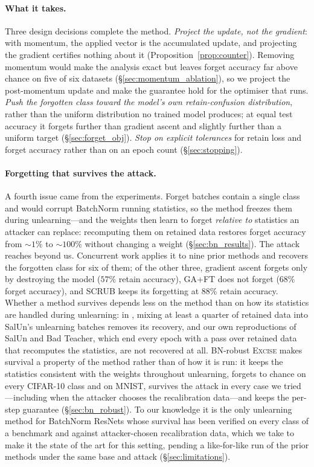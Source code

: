 \documentclass{article}
\newcommand{\ours}{\textsc{Excise}}
\newcommand{\rev}[1]{{\color{revisedB}#1}}
\theoremstyle{remark}
\theoremstyle{plain}
\begin{document}
\paragraph{What it takes.}
Three design decisions \rev{complete the method}. \emph{Project the update, not
the gradient}: with momentum, the applied vector is the accumulated update, and
projecting the gradient certifies nothing about it
(Proposition~\ref{prop:counter}). Removing momentum would make the analysis
exact but \rev{leaves forget accuracy far above chance on five of six datasets}
(\S\ref{sec:momentum_ablation}), so we project the post-momentum update and make
the guarantee hold for the optimiser that runs. \emph{Push the forgotten class
toward the model's own retain-confusion distribution}, rather than the uniform
distribution no trained model produces\rev{; at equal test accuracy it forgets
further than gradient ascent and slightly further than a uniform target}
(\S\ref{sec:forget_obj}). \emph{Stop on explicit tolerances} for retain loss and
forget accuracy rather than on an epoch count (\S\ref{sec:stopping}).

\paragraph{Forgetting that survives the attack.}
A fourth issue came from the experiments. Forget batches contain a single
class and would corrupt BatchNorm running statistics, so the method freezes them
during unlearning---and the weights then learn to forget \emph{relative to}
statistics an attacker can replace: recomputing them on retained data restores
forget accuracy from ${\sim}1\%$ to ${\sim}100\%$ without changing a weight
(\S\ref{sec:bn_results}). \rev{The attack reaches beyond us. Concurrent work
\citep{kalani2026batchnorm} applies it to nine prior methods and recovers the
forgotten class for six of them; of the other three, gradient ascent forgets
only by destroying the model ($57\%$ retain accuracy), GA+FT does not forget
($68\%$ forget accuracy), and SCRUB keeps its forgetting at $88\%$ retain
accuracy. Whether a method survives depends less on the method than on how its
statistics are handled during unlearning: in \citet{kalani2026batchnorm},
mixing at least a quarter of retained data into SalUn's unlearning batches
removes its recovery, and our own reproductions of SalUn and Bad Teacher, which
end every epoch with a pass over retained data that recomputes the statistics,
are not recovered at all. BN-robust \ours{} makes survival a property of the
method rather than of how it is run: it keeps the statistics consistent with the
weights throughout unlearning, forgets to chance on every CIFAR-10 class and on
MNIST, survives the attack in every case we tried---including when the attacker
chooses the recalibration data---and keeps the per-step guarantee
(\S\ref{sec:bn_robust}). To our knowledge it is the only unlearning method for
BatchNorm ResNets whose survival has been verified on every class of a benchmark
and against attacker-chosen recalibration data, which we take to make it the
state of the art for this setting, pending a like-for-like run of the prior
methods under the same base and attack (\S\ref{sec:limitations}).}
\end{document}
